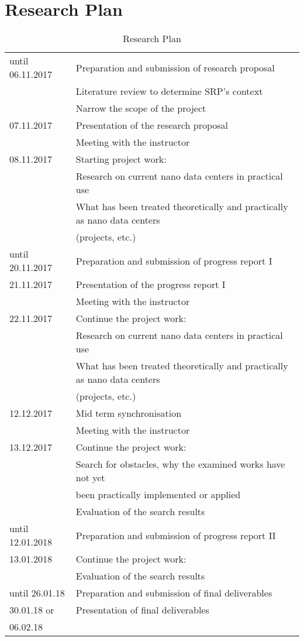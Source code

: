 \documentclass[sigchi-a, authorversion]{acmart}
\begin{document}
\section{Research Plan} %
\begin{table}[H]
  \caption{Research Plan}
  \label{tab:researchPlan}
  \begin{tabular}{ll}
    \toprule
    until 06.11.2017 & Preparation and submission of research proposal \\
    & Literature review to determine SRP's context \\
    & Narrow the scope of the project \\
    \hline
    07.11.2017 & Presentation of the research proposal \\
    & Meeting with the instructor \\
    \hline
    08.11.2017 & Starting project work: \\
    & Research on current nano data centers in practical use \\
    & What has been treated theoretically and practically as nano data centers \\
    & (projects, etc.) \\
    \hline
    until 20.11.2017 & Preparation and submission of progress report I \\
    \hline
    21.11.2017 & Presentation of the progress report I \\
    & Meeting with the instructor \\
    \hline
    22.11.2017 & Continue the project work: \\
    & Research on current nano data centers in practical use \\
    & What has been treated theoretically and practically as nano data centers \\
    & (projects, etc.) \\
    \hline
    12.12.2017 & Mid term synchronisation \\
    & Meeting with the instructor \\
    \hline
    13.12.2017 & Continue the project work: \\
    & Search for obstacles, why the examined works have not yet \\
    & been practically implemented or applied\\
    & Evaluation of the search results \\
    \hline
    until 12.01.2018 & Preparation and submission of progress report II \\
    \hline
    13.01.201\label{key}8 & Continue the project work: \\
    & Evaluation of the search results \\
    \hline
    until 26.01.18 & Preparation and submission of final deliverables \\
    \hline
    30.01.18 or & Presentation of final deliverables \\
    06.02.18 &  \\
    \bottomrule
  \end{tabular}
\end{table}
\end{document}
